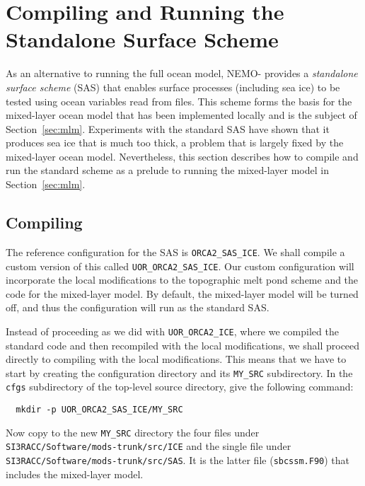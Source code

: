 \section{Compiling and Running the Standalone Surface Scheme}
\label{sec:sas}

As an alternative to running the full ocean model, NEMO-\SIcu{} provides a \textit{standalone surface scheme} (SAS) that enables surface processes (including sea ice) to be tested using ocean variables read from files.
This scheme forms the basis for the mixed-layer ocean model that has been implemented locally and is the subject of Section~\ref{sec:mlm}.
Experiments with the standard SAS have shown that it produces sea ice that is much too thick, a problem that is largely fixed by the mixed-layer ocean model.
Nevertheless, this section describes how to compile and run the standard scheme as a prelude to running the mixed-layer model in Section~\ref{sec:mlm}.


\subsection{Compiling}
\label{sec:sas:subsec:compiling}

The reference configuration for the SAS is \verb|ORCA2_SAS_ICE|.
We shall compile a custom version of this called \verb|UOR_ORCA2_SAS_ICE|.
Our custom configuration will incorporate the local modifications to the topographic melt pond scheme and the code for the mixed-layer model.
By default, the mixed-layer model will be turned off, and thus the configuration will run as the standard SAS.

Instead of proceeding as we did with \verb|UOR_ORCA2_ICE|, where we compiled the standard code and then recompiled with the local modifications, we shall proceed directly to compiling with the local modifications.
This means that we have to start by creating the configuration directory and its \verb|MY_SRC| subdirectory.
In the \verb|cfgs| subdirectory of the top-level source directory, give the following command:

\begin{verbatim}
  mkdir -p UOR_ORCA2_SAS_ICE/MY_SRC
\end{verbatim}

\noindent{}Now copy to the new \verb|MY_SRC| directory the four files under \verb|SI3RACC/Software/|\newline\verb|mods-trunk/src/ICE| and the single file under \verb|SI3RACC/Software/mods-trunk/|\newline\verb|src/SAS|.
It is the latter file (\verb|sbcssm.F90|) that includes the mixed-layer model.

